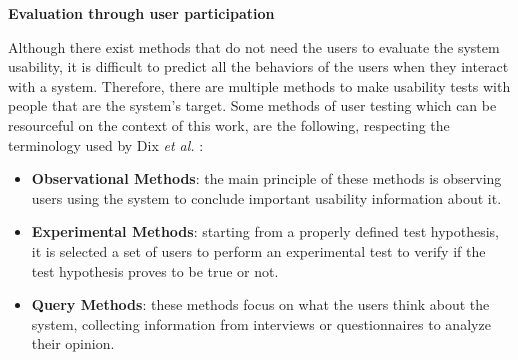 \bigskip

\textbf{Evaluation through user participation}

Although there exist methods that do not need the users to evaluate the system usability, it is difficult to predict all the behaviors of the users when they interact with a system. Therefore, there are multiple methods to make usability tests with people that are the system's target. Some methods of user testing which can be resourceful on the context of this work, are the following, respecting the terminology used by Dix \textit{et al.} \cite{humanComputerInteraction}:

\begin{itemize}
	\item \textbf{Observational Methods}: the main principle of these methods is observing users using the system to conclude important usability information about it. %
	\item \textbf{Experimental Methods}: starting from a properly defined test hypothesis, it is selected a set of users to perform an experimental test to verify if the test hypothesis proves to be true or not. %
	\item \textbf{Query Methods}: these methods focus on what the users think about the system, collecting information from interviews or questionnaires to analyze their opinion. %
\end{itemize}

